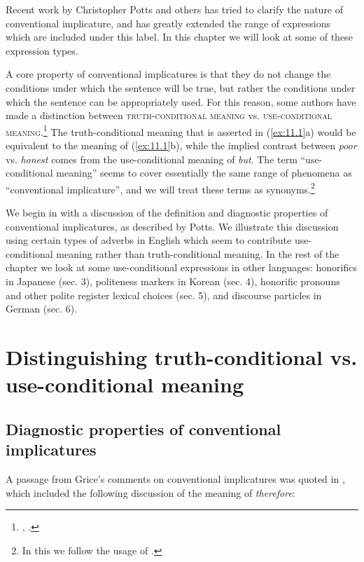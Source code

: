 Recent work by Christopher Potts and others has tried to clarify the nature of conventional implicature, and has greatly extended the range of expressions which are included under this label. In this chapter we will look at some of these expression types.



A core property of conventional implicatures is that they do not change the conditions under which the sentence will be true, but rather the conditions under which the sentence can be appropriately used. For this reason, some authors have made a distinction between \textsc{truth-conditional meaning} vs. \textsc{use-conditional meaning}.\footnote{\citet{Gutzmann2015}, \citet{Recanati2004}.} The truth-conditional meaning that is asserted in (\ref{ex:11.1}a) would be equivalent to the meaning of (\ref{ex:11.1}b), while the implied contrast between \textit{poor} vs. \textit{honest} comes from the use-conditional meaning of \textit{but}. The term “use-conditional meaning” seems to cover essentially the same range of phenomena as “conventional implicature”, and we will treat these terms as synonyms.\footnote{In this we follow the usage of \citet{Gutzmann2015}.}



We begin in  with a discussion of the definition and diagnostic properties of conventional implicatures, as described by Potts. We illustrate this discussion using certain types of adverbs in English which seem to contribute use-conditional meaning rather than truth-conditional meaning. In the rest of the chapter we look at some use-conditional expressions in other languages: honorifics in Japanese (sec. 3), politeness markers in Korean (sec. 4), honorific pronouns and other polite register lexical choices (sec. 5), and discourse particles in German (sec. 6).


\section{Distinguishing truth-conditional vs. use-conditional meaning}\label{sec:11.2}
\subsection{Diagnostic properties of conventional implicatures}\label{sec:11.2.1}

A passage from Grice’s comments on conventional implicatures was quoted in , which included the following discussion of the meaning of \textit{therefore}:


